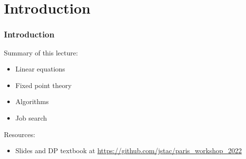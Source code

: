 


\subtitle{Prelude to Dynamic Programming}

\author{John Stachurski}

\date{September 2022}




\begin{frame}
  \titlepage
\end{frame}


\section{Introduction}


\begin{frame}
    \frametitle{Introduction}

    Summary of this lecture:

    \begin{itemize}
        \item Linear equations
            \vspace{0.3em}
        \item Fixed point theory
            \vspace{0.3em}
        \item Algorithms
            \vspace{0.3em}
        \item Job search
    \end{itemize}

            \vspace{0.3em}
            \vspace{0.3em}

    Resources:
    \begin{itemize}
        \item Slides and DP textbook at \url{https://github.com/jstac/paris_workshop_2022}
    \end{itemize}


\end{frame}



    


